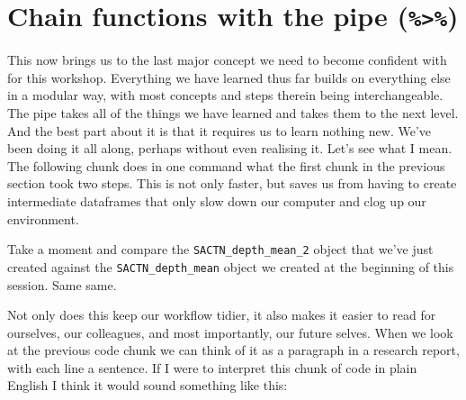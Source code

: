 \documentclass[]{book}
\newenvironment{Shaded}{\begin{snugshade}}{\end{snugshade}}
\newcommand{\KeywordTok}[1]{\textcolor[rgb]{0.13,0.29,0.53}{\textbf{#1}}}
\newcommand{\DataTypeTok}[1]{\textcolor[rgb]{0.13,0.29,0.53}{#1}}
\newcommand{\DecValTok}[1]{\textcolor[rgb]{0.00,0.00,0.81}{#1}}
\newcommand{\StringTok}[1]{\textcolor[rgb]{0.31,0.60,0.02}{#1}}
\newcommand{\CommentTok}[1]{\textcolor[rgb]{0.56,0.35,0.01}{\textit{#1}}}
\newcommand{\OtherTok}[1]{\textcolor[rgb]{0.56,0.35,0.01}{#1}}
\newcommand{\OperatorTok}[1]{\textcolor[rgb]{0.81,0.36,0.00}{\textbf{#1}}}
\newcommand{\NormalTok}[1]{#1}
\theoremstyle{definition}
\theoremstyle{definition}
\theoremstyle{definition}
\theoremstyle{remark}
\begin{document}
\section{\texorpdfstring{Chain functions with the pipe
(\texttt{\%\textgreater{}\%})}{Chain functions with the pipe (\%\textgreater{}\%)}}\label{chain-functions-with-the-pipe}

This now brings us to the last major concept we need to become confident
with for this workshop. Everything we have learned thus far builds on
everything else in a modular way, with most concepts and steps therein
being interchangeable. The pipe takes all of the things we have learned
and takes them to the next level. And the best part about it is that it
requires us to learn nothing new. We've been doing it all along, perhaps
without even realising it. Let's see what I mean. The following chunk
does in one command what the first chunk in the previous section took
two steps. This is not only faster, but saves us from having to create
intermediate dataframes that only slow down our computer and clog up our
environment.

\begin{Shaded}
\end{Shaded}

Take a moment and compare the \texttt{SACTN\_depth\_mean\_2} object that
we've just created against the \texttt{SACTN\_depth\_mean} object we
created at the beginning of this session. Same same.

Not only does this keep our workflow tidier, it also makes it easier to
read for ourselves, our colleagues, and most importantly, our future
selves. When we look at the previous code chunk we can think of it as a
paragraph in a research report, with each line a sentence. If I were to
interpret this chunk of code in plain English I think it would sound
something like this:
\end{document}
